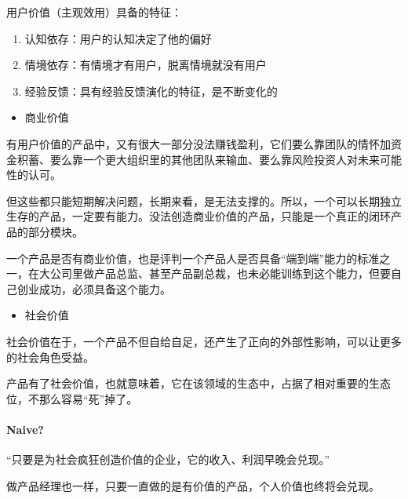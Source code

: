 \documentclass[letterpaper,10pt,english]{sphinxmanual}
\begin{document}
用户价值（主观效用）具备的特征：
%
\begin{footnote}[825]\sphinxAtStartFootnote
{}
%
\end{footnote}
\begin{enumerate}
%
\item {} 
认知依存：用户的认知决定了他的偏好

\item {} 
情境依存：有情境才有用户，脱离情境就没有用户

\item {} 
经验反馈：具有经验反馈演化的特征，是不断变化的

\end{enumerate}
\begin{itemize}
\item {} 
商业价值

\end{itemize}

有用户价值的产品中，又有很大一部分没法赚钱盈利，它们要么靠团队的情怀加资金积蓄、要么靠一个更大组织里的其他团队来输血、要么靠风险投资人对未来可能性的认可。

但这些都只能短期解决问题，长期来看，是无法支撑的。所以，一个可以长期独立生存的产品，一定要有能力。没法创造商业价值的产品，只能是一个真正的闭环产品的部分模块。

一个产品是否有商业价值，也是评判一个产品人是否具备“端到端”能力的标准之一，在大公司里做产品总监、甚至产品副总裁，也未必能训练到这个能力，但要自己创业成功，必须具备这个能力。
\begin{itemize}
\item {} 
社会价值

\end{itemize}

社会价值在于，一个产品不但自给自足，还产生了正向的外部性影响，可以让更多的社会角色受益。

产品有了社会价值，也就意味着，它在该领域的生态中，占据了相对重要的生态位，不那么容易“死”掉了。


\paragraph{Naive?}
\label{\detokenize{chapter_project/valuable:naive}}
“只要是为社会疯狂创造价值的企业，它的收入、利润早晚会兑现。”

做产品经理也一样，只要一直做的是有价值的产品，个人价值也终将会兑现。
\end{document}
